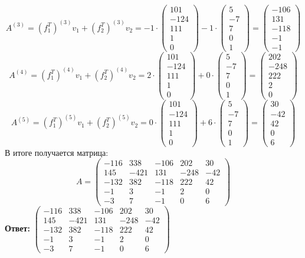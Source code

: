 \documentclass[a4paper]{article}
\newcommand{\mat}[1]{\begin{pmatrix} #1 \end{pmatrix}}
\begin{document}
\begin{enumerate}
    $$A^{(3)} = (f_1^T)^{(3)} v_1 + (f_2^T)^{(3)} v_2 
    = -1\cdot \mat{101\\-124\\111\\1\\0}-1\cdot \mat{5\\-7\\7\\0\\1}=
    \mat{ -106 \\ 131 \\ -118 \\ -1 \\ -1 }$$
    $$A^{(4)} = (f_1^T)^{(4)} v_1 + (f_2^T)^{(4)} v_2 
    = 2\cdot \mat{101\\-124\\111\\1\\0}+0\cdot \mat{5\\-7\\7\\0\\1}=
    \mat{202 \\ -248 \\ 222 \\ 2 \\ 0 }$$
    $$A^{(5)} = (f_1^T)^{(5)} v_1 + (f_2^T)^{(5)} v_2 
    = 0\cdot \mat{101\\-124\\111\\1\\0}+6\cdot \mat{5\\-7\\7\\0\\1}=
    \mat{30 \\ -42 \\ 42 \\ 0 \\ 6}$$
    В итоге получается матрица:
    $$A = \mat{-116 & 338 & -106 & 202 & 30 \\
    145 & -421 & 131 & -248 & -42 \\
    -132 & 382 & -118 & 222 & 42 \\
    -1 & 3 & -1 & 2 & 0 \\
    -3 & 7 & -1 & 0 & 6}$$
    \textbf{Ответ:} $\mat{-116 & 338 & -106 & 202 & 30 \\
    145 & -421 & 131 & -248 & -42 \\
    -132 & 382 & -118 & 222 & 42 \\
    -1 & 3 & -1 & 2 & 0 \\
    -3 & 7 & -1 & 0 & 6}$\\


\end{enumerate}
\end{document}
